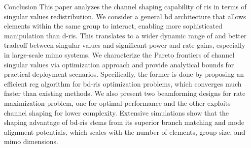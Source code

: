 \begin{section}{Conclusion}
 This paper analyzes the channel shaping capability of \gls{ris} in terms of singular values redistribution.
 We consider a general \gls{bd} architecture that allows elements within the same group to interact, enabling more sophisticated manipulation than \gls{d}-\gls{ris}.
 This translates to a wider dynamic range of and better tradeoff between singular values and significant power and rate gains, especially in large-scale \gls{mimo} systems.
 We characterize the Pareto frontiers of channel singular values via optimization approach and provide analytical bounds for practical deployment scenarios.
 Specifically, the former is done by proposing an efficient \gls{rcg} algorithm for \gls{bd}-\gls{ris} optimization problems, which converges much faster than existing methods.
 We also present two beamforming designs for rate maximization problem, one for optimal performance and the other exploits channel shaping for lower complexity.
 Extensive simulations show that the shaping advantage of \gls{bd}-\gls{ris} stems from its superior branch matching and mode alignment potentials, which scales with the number of elements, group size, and \gls{mimo} dimensions.

\end{section}



